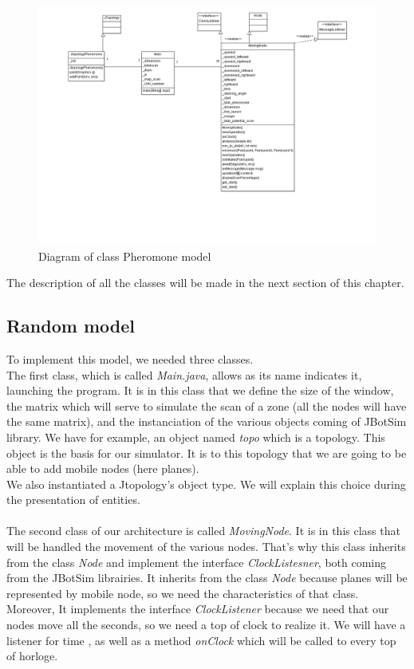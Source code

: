 \begin{figure}[h]
\center
\includegraphics[scale=0.6]{../images/DiagrammedeclassesPheromone.png}
\caption{\label{RandomWalkDIA}Diagram of class Pheromone model}
\end{figure}

The description of all the classes will be made in the next section of this chapter.

\subsection{Random model} 

To implement this model, we needed three classes.\\
The first class, which is called \textit{Main.java}, allows as its name indicates it, launching the program. It is in this class that we define the size of the window, the matrix which will serve to simulate the scan of a zone (all the nodes will have the same matrix), and the instanciation of the various objects coming of JBotSim library. We have for example, an object named \textit{topo} which is a topology. This object is the basis for our simulator. It is to this topology that we are going to be able to add mobile nodes (here planes).\\

We also instantiated a Jtopology's object type. We will explain this choice during the presentation of entities.\\\\

The second class of our architecture is called \textit{MovingNode}. It is in this class that will be handled the movement of the various nodes. That's why this class inherits from the class \textit{Node} and implement the interface \textit{ClockListesner}, both coming from the JBotSim librairies. It inherits from the class \textit{Node} because planes will be represented by mobile node, so we need the characteristics of that class. Moreover, It implements the interface \textit{ClockListener} because we need that our nodes move all the seconds, so we need a top of clock to realize it. We will have a listener for time , as well as a method \textit{onClock} which will be called to every top of horloge.\\\\

